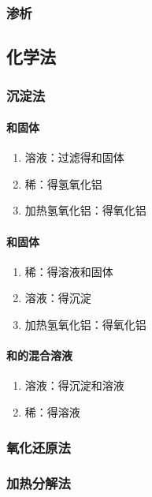 \documentclass[a4paper]{article}
\begin{document}
	\subsubsection{渗析}
	
	
	\subsection{化学法}
	
	\subsubsection{沉淀法}
	\paragraph{和固体}
	\begin{enumerate}
		\item {}溶液：过滤得和固体
		\item 稀：得氢氧化铝
		\item 加热氢氧化铝：得氧化铝
	\end{enumerate}
	\paragraph{和固体}
	\begin{enumerate}
		\item 稀：得溶液和固体
		\item {}溶液：得沉淀
		\item 加热氢氧化铝：得氧化铝
	\end{enumerate}
	\paragraph{和的混合溶液}
	\begin{enumerate}
		\item {}溶液：得沉淀和溶液
		\item 稀：得溶液
	\end{enumerate}
	
	\subsubsection{氧化还原法}
	
	\subsubsection{加热分解法}
	
\end{document}
